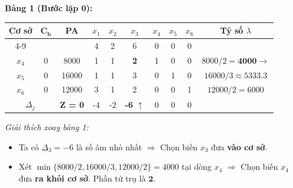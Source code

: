 \textbf{Bảng 1 (Bước lặp 0):}
\begin{table}[H]
    \centering
    \renewcommand{\arraystretch}{1.3}
    \begin{tabular}{|c|c|c|c|c|c|c|c|c|c|}
        \hline
        \multirow{2}{*}{\textbf{Cơ sở}} & \multirow{2}{*}{$\mathbf{C_b}$} & \multirow{2}{*}{\textbf{PA}} & $x_1$ & $x_2$ & $x_3$ & $x_4$ & $x_5$ & $x_6$ & \multirow{2}{*}{\textbf{Tỷ số $\lambda$}} \\
        \cline{4-9}
        & & & 4 & 2 & 6 & 0 & 0 & 0 & \\
        \hline
        $x_4$ & 0 & 8000 & 1 & 1 & \textbf{2} & 1 & 0 & 0 & $8000/2 = \mathbf{4000} \rightarrow$ \\
        \hline
        $x_5$ & 0 & 16000 & 1 & 1 & 3 & 0 & 1 & 0 & $16000/3 \approx 5333.3$ \\
        \hline
        $x_6$ & 0 & 12000 & 3 & 1 & 2 & 0 & 0 & 1 & $12000/2 = 6000$ \\
        \hline
        \multicolumn{2}{|c|}{$\Delta_j$} & \textbf{Z = 0} & -4 & -2 & \textbf{-6} $\uparrow$ & 0 & 0 & 0 & \\
        \hline
    \end{tabular}
\end{table}
\textit{Giải thích xoay bảng 1:}
\begin{itemize}[itemsep=0pt, parsep=0pt, topsep=0pt]
    \item Ta có $\Delta_3 = -6$ là số âm nhỏ nhất $\Rightarrow$ Chọn biến $x_3$ đưa \textbf{vào cơ sở}.
    \item Xét $\min\{8000/2, 16000/3, 12000/2\} = 4000$ tại dòng $x_4$ $\Rightarrow$ Chọn biến $x_4$ đưa \textbf{ra khỏi cơ sở}. Phần tử trụ là $\mathbf{2}$.
\end{itemize}

